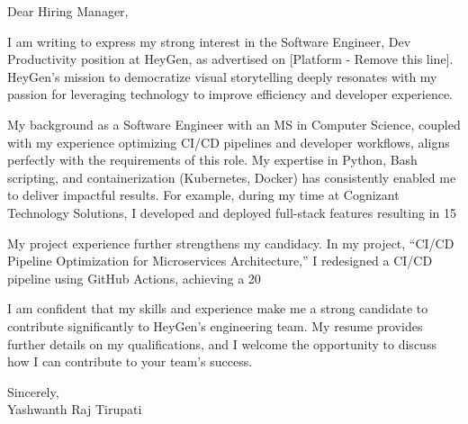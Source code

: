 \documentclass[letterpaper,11pt]{article}
\begin{document}
\begin{flushleft}
Dear Hiring Manager,

\vspace{12pt}

I am writing to express my strong interest in the Software Engineer, Dev Productivity position at HeyGen, as advertised on [Platform - Remove this line].  HeyGen's mission to democratize visual storytelling deeply resonates with my passion for leveraging technology to improve efficiency and developer experience.

\vspace{12pt}

My background as a Software Engineer with an MS in Computer Science, coupled with my experience optimizing CI/CD pipelines and developer workflows, aligns perfectly with the requirements of this role.  My expertise in Python, Bash scripting, and containerization (Kubernetes, Docker) has consistently enabled me to deliver impactful results.  For example, during my time at Cognizant Technology Solutions, I developed and deployed full-stack features resulting in 15%


\vspace{12pt}

My project experience further strengthens my candidacy.  In my project, “CI/CD Pipeline Optimization for Microservices Architecture,” I redesigned a CI/CD pipeline using GitHub Actions, achieving a 20%

\vspace{12pt}

I am confident that my skills and experience make me a strong candidate to contribute significantly to HeyGen's engineering team. My resume provides further details on my qualifications, and I welcome the opportunity to discuss how I can contribute to your team’s success.

\vspace{20pt}

Sincerely, \\
Yashwanth Raj Tirupati

\end{flushleft}
\end{document}
